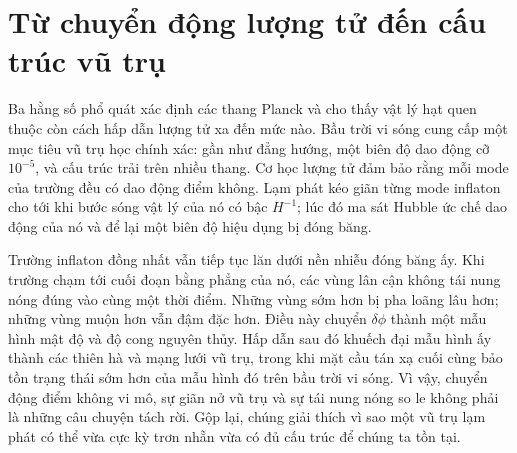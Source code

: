 \begin{classroomqa}
\end{classroomqa}

\section{Từ chuyển động lượng tử đến cấu trúc vũ trụ}

Ba hằng số phổ quát xác định các thang Planck và cho thấy vật lý hạt quen thuộc còn cách hấp dẫn lượng tử xa đến mức nào. Bầu trời vi sóng cung cấp một mục tiêu vũ trụ học chính xác: gần như đẳng hướng, một biên độ dao động cỡ \(10^{-5}\), và cấu trúc trải trên nhiều thang. Cơ học lượng tử đảm bảo rằng mỗi mode của trường đều có dao động điểm không. Lạm phát kéo giãn từng mode inflaton cho tới khi bước sóng vật lý của nó có bậc \(H^{-1}\); lúc đó ma sát Hubble ức chế dao động của nó và để lại một biên độ hiệu dụng bị đóng băng.

Trường inflaton đồng nhất vẫn tiếp tục lăn dưới nền nhiễu đóng băng ấy. Khi trường chạm tới cuối đoạn bằng phẳng của nó, các vùng lân cận không tái nung nóng đúng vào cùng một thời điểm. Những vùng sớm hơn bị pha loãng lâu hơn; những vùng muộn hơn vẫn đậm đặc hơn. Điều này chuyển \(\delta\phi\) thành một mẫu hình mật độ và độ cong nguyên thủy. Hấp dẫn sau đó khuếch đại mẫu hình ấy thành các thiên hà và mạng lưới vũ trụ, trong khi mặt cầu tán xạ cuối cùng bảo tồn trạng thái sớm hơn của mẫu hình đó trên bầu trời vi sóng. Vì vậy, chuyển động điểm không vi mô, sự giãn nở vũ trụ và sự tái nung nóng so le không phải là những câu chuyện tách rời. Gộp lại, chúng giải thích vì sao một vũ trụ lạm phát có thể vừa cực kỳ trơn nhẵn vừa có đủ cấu trúc để chúng ta tồn tại.